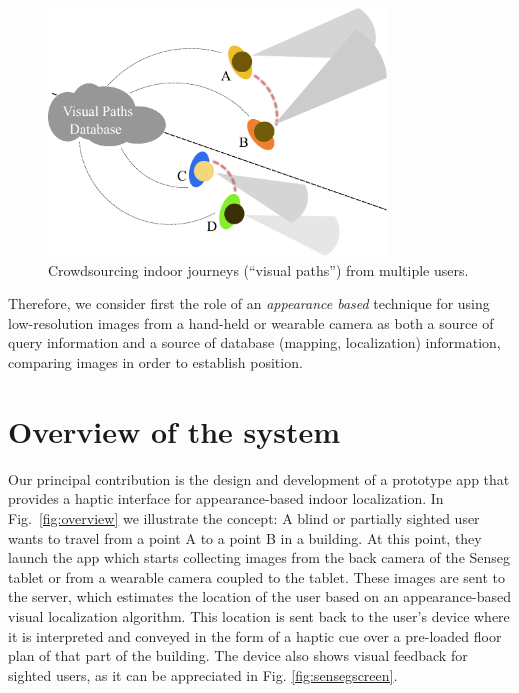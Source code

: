 \begin{figure}[h]
\centering
\includegraphics[width=0.8\textwidth]{gfx/Chapter06/AssociatingViews.pdf}
\caption{Crowdsourcing indoor journeys (``visual paths'') from multiple users.}
\label{fig:associatingViews}
\end{figure}

Therefore, we consider first the role of an {\em appearance based} technique for using low-resolution images from a hand-held or wearable camera as both a source of query information and a source of database (mapping, localization) information, comparing images in order to establish position. 

\section{Overview of the system}
\label{sec:overview}

Our principal contribution is the design and development of a prototype app that provides a haptic interface for appearance-based indoor localization. In Fig.~\ref{fig:overview} we illustrate the concept: A blind or partially sighted user wants to travel from a point A to a point B in a building. At this point, they launch the app which starts collecting images from the back camera of the Senseg tablet or from a wearable camera coupled to the tablet. These images are sent to the server, which estimates the location of the user based on an appearance-based visual localization algorithm. This location is sent back to the user's device where it is interpreted and conveyed in the form of a haptic cue over a pre-loaded floor plan of that part of the building. The device also shows visual feedback for sighted users, as it can be appreciated in Fig. \ref{fig:sensegscreen}.

